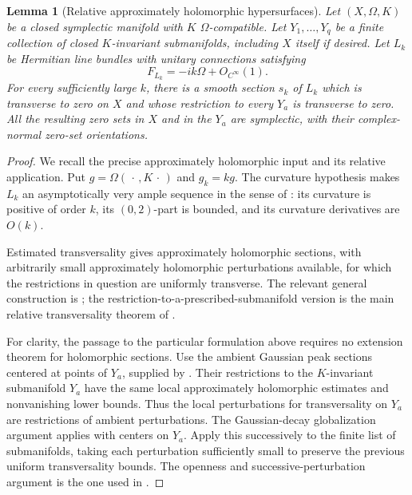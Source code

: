 \documentclass[11pt]{amsart}
\newtheorem{lemma}[theorem]{Lemma}
\theoremstyle{definition}
\theoremstyle{remark}
\begin{document}
\begin{lemma}[Relative approximately holomorphic hypersurfaces]
\label{lem:relative-AH}
Let $(X,\Omega,K)$ be a closed symplectic manifold with $K$
$\Omega$-compatible.  Let $Y_1,\ldots,Y_q$ be a finite collection
of closed $K$-invariant submanifolds, including $X$ itself if
desired.  Let $L_k$ be Hermitian line bundles with unitary
connections satisfying
\[
F_{L_k}=-ik\Omega+O_{C^\infty}(1).
\]
For every sufficiently large $k$, there is a smooth section $s_k$
of $L_k$ which is transverse to zero on $X$ and whose restriction
to every $Y_a$ is transverse to zero.  All the resulting zero
sets in $X$ and in the $Y_a$ are symplectic, with their
complex-normal zero-set orientations.
\end{lemma}

\begin{proof}
We recall the precise approximately holomorphic input and its
relative application.  Put $g=\Omega(\,\cdot\,,K\,\cdot\,)$ and
$g_k=kg$.  The curvature hypothesis makes $L_k$ an
asymptotically very ample sequence in the sense of
\cite[Definition~2.1]{Auroux01}: its curvature is positive of
order $k$, its $(0,2)$-part is bounded, and its curvature
derivatives are $O(k)$.

Estimated transversality gives approximately holomorphic sections,
with arbitrarily small approximately holomorphic perturbations
available, for which the restrictions in question are uniformly
transverse.  The relevant general construction is
\cite[Theorem~1.1 and Section~4]{Auroux01}; the
restriction-to-a-prescribed-submanifold version is the main
relative transversality theorem of \cite{Mohsen}.

For clarity, the passage to the particular formulation above
requires no extension theorem for holomorphic sections.
Use the ambient Gaussian peak sections centered at points of
$Y_a$, supplied by \cite[Lemma~2.3]{Auroux01}.  Their restrictions
to the $K$-invariant submanifold $Y_a$ have the same local
approximately holomorphic estimates and nonvanishing lower
bounds.  Thus the local perturbations for transversality on
$Y_a$ are restrictions of ambient perturbations.  The
Gaussian-decay globalization argument applies with centers on
$Y_a$.  Apply this successively to the finite list of submanifolds,
taking each perturbation sufficiently small to preserve the
previous uniform transversality bounds.  The openness and
successive-perturbation argument is the one used in
\cite[proof of Theorem~2]{Auroux97}.


\end{proof}
\end{document}
